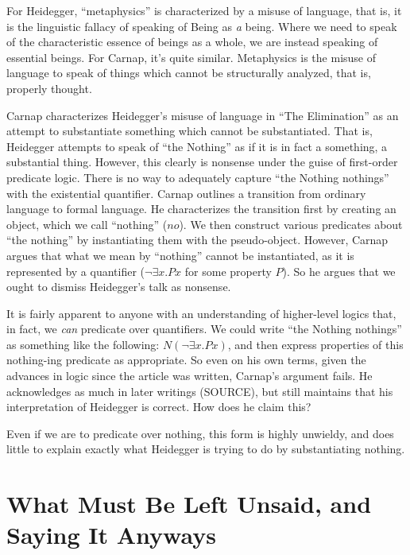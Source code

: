 \documentclass[leqno, 12pt]{turabian-researchpaper}
\begin{document}
	For Heidegger, \enquote{metaphysics} is characterized by a misuse of language,
	that is, it is the linguistic fallacy of speaking of Being as \emph{a} being.
	Where we need to speak of the characteristic essence of beings as a whole, we are
	instead speaking of essential beings. For Carnap, it's quite similar.
	Metaphysics is the misuse of language to speak of things which cannot be
	structurally analyzed, that is, properly thought.

	Carnap characterizes Heidegger's misuse of language in \enquote{The Elimination}
	as an attempt to substantiate something which cannot be substantiated. That is,
	Heidegger attempts to speak of \enquote{the Nothing} as if it is in fact a
	something, a substantial thing. However, this clearly is nonsense under the guise
	of first-order predicate logic. There is no way to adequately capture \enquote{the Nothing nothings}
	with the existential quantifier. Carnap outlines a transition from ordinary
	language to formal language. He characterizes the transition first by creating
	an object, which we call \enquote{nothing} ($no$). We then construct various
	predicates about \enquote{the nothing} by instantiating them with the pseudo-object.
	However, Carnap argues that what we mean by \enquote{nothing} cannot be
	instantiated, as it is represented by a quantifier ($\neg\exists x.Px$ for
	some property $P$). So he argues that we ought to dismiss Heidegger's talk as
	nonsense.

	It is fairly apparent to anyone with an understanding of higher-level logics
	that, in fact, we \emph{can} predicate over quantifiers. We could write
	\enquote{the Nothing nothings} as something like the following:
	$N(\neg\exists x . Px)$, and then express properties of this nothing-ing predicate
	as appropriate. So even on his own terms, given the advances in logic since the
	article was written, Carnap's argument fails. He acknowledges as much in later
	writings (SOURCE), but still maintains that his interpretation of Heidegger is
	correct. How does he claim this?

	Even if we are to predicate over nothing, this form is highly unwieldy, and does
	little to explain exactly what Heidegger is trying to do by substantiating nothing.

	\section{What Must Be Left Unsaid, and Saying It Anyways}
\end{document}
